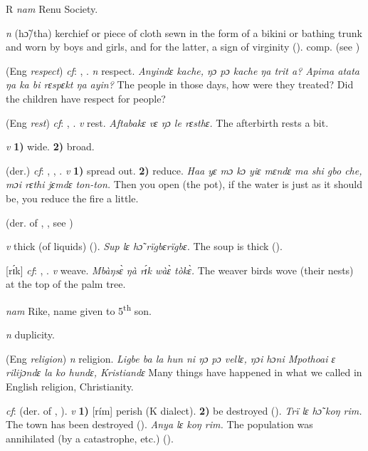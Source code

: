 \begin{letter}{R}
 \textit{nam} Renu Society.

 \textit{n} (hɔ̃/tha) kerchief or piece of cloth sewn in the form of a bikini or bathing trunk and worn by boys and girls, and for the latter, a sign of virginity (\citealt{Pichl1967}). comp.  (see ) 

 (Eng \textit{respect}) \textit{cf}: , . \textit{n} respect. \textit{Anyindɛ kache, ŋɔ pɔ kache ŋa trit a? Apima atata ŋa ka bi rɛspɛkt ŋa ayin?} The people in those days, how were they treated? Did the children have respect for people?

 (Eng \textit{rest}) \textit{cf}: , . \textit{v} rest. \textit{Aftabakɛ vɛ ŋɔ le rɛsthɛ.} The afterbirth rests a bit.

 \textit{v} \textbf{1)} wide. \textbf{2)} broad.

 (der.) \textit{cf}: , , . \textit{v} \textbf{1)} spread out. \textbf{2)} reduce. \textit{Haa yɛ mɔ kɔ yiɛ mɛndɛ ma shi gbo che, mɔi rɛthi jɛmdɛ ton-ton.} Then you open (the pot), if the water is just as it should be, you reduce the fire a little.

 (der. of , , see ) 

 \textit{v} thick (of liquids) (\citealt{Pichl1967}). \textit{Sup lɛ hɔ̃ rïgbɛrïgbɛ.} The soup is thick (\citealt{Pichl1967}). 

 [rɪ́k] \textit{cf}: , . \textit{v} weave. \textit{Mbàŋsɛ̀ ŋà rɪ́k wàɛ̀ tòkɛ̀.} The weaver birds wove (their nests) at the top of the palm tree.

 \textit{nam} Rike, name given to 5\textsuperscript{th} son. 

 \textit{n} duplicity.

 (Eng \textit{religion}) \textit{n} religion. \textit{Ligbe ba la hun ni ŋɔ pɔ vellɛ, ŋɔi hɔni Mpothoai ɛ rilijɔndɛ la ko hundɛ, Kristiandɛ} Many things have happened in what we called in English religion, Christianity.

 \textit{cf}:  (der. of , ). \textit{v} \textbf{1)} [rím] perish (K dialect). \textbf{2)} be destroyed (\citealt{Pichl1967}). \textit{Trï lɛ hɔ̃ koŋ rim.} The town has been destroyed (\citealt{Pichl1967}). \textit{Anya lɛ koŋ rim.} The population was annihilated (by a catastrophe, etc.) (\citealt{Pichl1967}). 


\end{letter}
